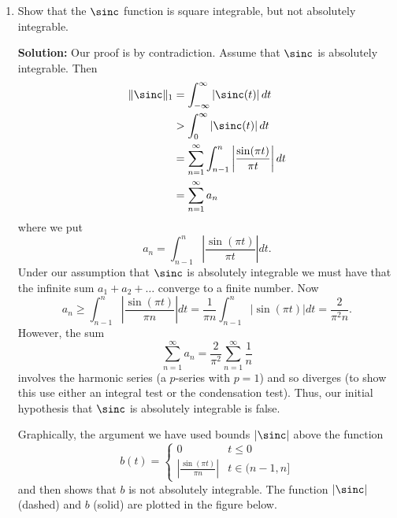 \documentclass[11pt,a4paper]{book}
\theoremstyle{plain}
\numberwithin{equation}{section}
\newcommand{\abs}[1]{\left\vert #1 \right\vert}
\newenvironment{solution}{\begin{footnotesize}\textbf{Solution:}}{\end{footnotesize}}
\newcounter{test}
\newenvironment{excersizelist}{%
  \renewcommand*{\theenumi}{\thechapter.\arabic{enumi}}%
  \newcommand\itemadvanced{\stepcounter{enumi}\item[$\ast$\, \theenumi.]}
  \begin{enumerate}
}{%
  \end{enumerate}
}
\begin{document}
\begin{excersizelist}
\item \label{exer:sincnotabsint}  Show that the $\sinc$ function is square integrable, but not absolutely integrable.
\begin{solution}
Our proof is by contradiction.  Assume that $\sinc$ is absolutely integrable.  Then
\begin{align*}
\|\sinc\|_1 &= \int_{-\infty}^\infty \abs{\sinc(t)} dt \\
&> \int_{0}^\infty \abs{\sinc(t)} dt \\
&= \sum_{n=1}^\infty \int_{n-1}^{n} \abs{\frac{\sin(\pi t)}{\pi t}} dt \\
&= \sum_{n=1}^\infty a_n
\end{align*}
where we put
\[
a_n = \int_{n-1}^{n} \abs{\frac{\sin(\pi t)}{\pi t}} dt.
\] 
Under our assumption that $\sinc$ is absolutely integrable we must have that the infinite sum $a_1 + a_2 + \dots$ converge to a finite number.  Now
\[
a_n \geq  \int_{n-1}^{n} \abs{\frac{\sin(\pi t)}{\pi n}} dt = \frac{1}{\pi n} \int_{n-1}^{n} \abs{\sin(\pi t)} dt = \frac{2}{\pi^2 n}.
\]
However, the sum 
\[
\sum_{n=1}^\infty a_n = \frac{2}{\pi^2} \sum_{n=1}^\infty \frac{1}{n}
\]
involves the harmonic series (a $p$-series with $p=1$) and so diverges (to show this use either an integral test or the condensation test).  Thus, our initial hypothesis that $\sinc$ is absolutely integrable is false.

Graphically, the argument we have used bounds $\abs{\sinc}$ above the function
\[
b(t) =  \begin{cases}
0 & t \leq 0 \\
\abs{\frac{\sin(\pi t)}{\pi n}} & t \in (n-1, n] 
\end{cases}
\]
and then shows that $b$ is not absolutely integrable.  The function $\abs{\sinc}$ (dashed) and $b$ (solid) are plotted in the figure below.


\end{solution}
\end{excersizelist}
\end{document}
